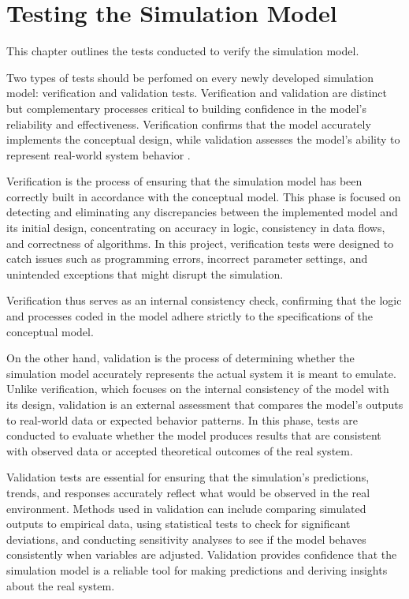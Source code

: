\chapter{Testing the Simulation Model}\label{ch:testing}

This chapter outlines the tests conducted to verify the simulation model.

Two types of tests should be perfomed on every newly developed simulation
model: verification and validation tests. Verification and validation are
distinct but complementary processes critical to building confidence in the
model's reliability and effectiveness. Verification confirms that the model
accurately implements the conceptual design, while validation assesses the
model's ability to represent real-world system behavior
\cite[Chapter~15]{omnetpp-simulation-manual}.

Verification is the process of ensuring that the simulation model has been
correctly built in accordance with the conceptual model. This phase is focused
on detecting and eliminating any discrepancies between the implemented model
and its initial design, concentrating on accuracy in logic, consistency in data
flows, and correctness of algorithms. In this project, verification tests were
designed to catch issues such as programming errors, incorrect parameter
settings, and unintended exceptions that might disrupt the simulation.

Verification thus serves as an internal consistency check, confirming that the
logic and processes coded in the model adhere strictly to the specifications of
the conceptual model.

On the other hand, validation is the process of determining whether the
simulation model accurately represents the actual system it is meant to
emulate. Unlike verification, which focuses on the internal consistency of the
model with its design, validation is an external assessment that compares the
model's outputs to real-world data or expected behavior patterns. In this
phase, tests are conducted to evaluate whether the model produces results that
are consistent with observed data or accepted theoretical outcomes of the real
system.

Validation tests are essential for ensuring that the simulation's predictions,
trends, and responses accurately reflect what would be observed in the real
environment. Methods used in validation can include comparing simulated outputs
to empirical data, using statistical tests to check for significant deviations,
and conducting sensitivity analyses to see if the model behaves consistently
when variables are adjusted. Validation provides confidence that the simulation
model is a reliable tool for making predictions and deriving insights about the
real system.

